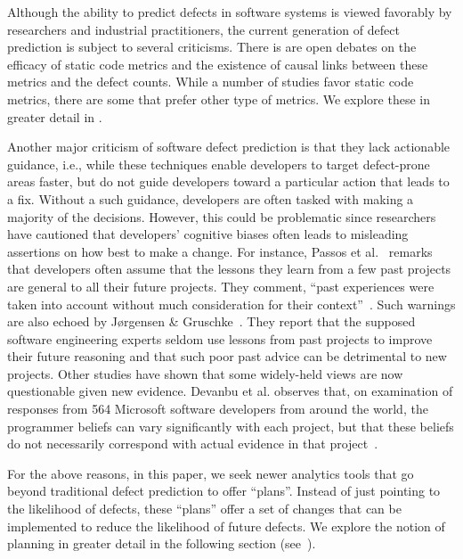  Although the ability to predict defects in software systems is viewed favorably by researchers and industrial practitioners, the current generation of defect prediction is subject to several criticisms. There is are open debates on the efficacy of static code metrics and the existence of causal links between these metrics and the defect counts. While a number of studies favor static code metrics, there are some that prefer other type of metrics. We explore these in greater detail in  .

Another major criticism of software defect prediction is that they lack actionable guidance, i.e., while these techniques enable developers to target defect-prone areas faster, but do not guide developers toward a particular action that leads to a fix. Without a such guidance, developers are often tasked with making a majority of the decisions. However, this could be problematic since researchers have cautioned that developers' cognitive biases often leads to misleading assertions on how best to make a change. For instance, Passos et al.~\citep{passos11} remarks that developers often assume that the lessons they learn from a few past projects are general to all their future projects.  They comment, ``past experiences were taken into account without much consideration for their context''~\citep{passos11}. Such warnings are also echoed by J{\o}rgensen \& Gruschke~\citep{jorgensen09}. They report that the supposed software engineering experts seldom use lessons from past projects to improve their future reasoning and that such poor past advice can be detrimental to new projects. Other studies have shown that some widely-held views are now questionable given new evidence. Devanbu et al. observes that, on examination of responses from 564 Microsoft software developers from around the world, the programmer beliefs can vary significantly with each project, but that these beliefs do not necessarily correspond with actual evidence in that project~\citep{prem16}.

For the above reasons, in this paper, we seek newer analytics tools that go beyond traditional defect prediction to offer ``plans''. Instead of just pointing to the likelihood of defects, these ``plans'' offer a set of changes that can be implemented to reduce the likelihood of future defects. We explore the notion of planning in greater detail in the following section (see~). 

